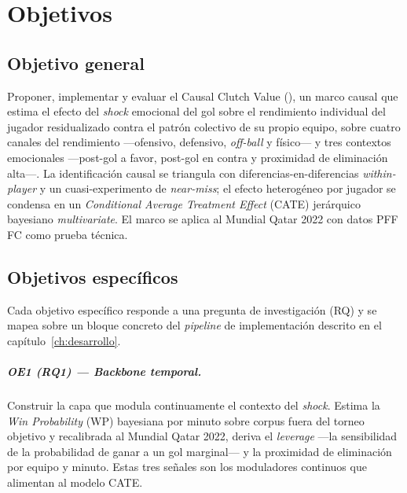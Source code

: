 \chapter{Objetivos}
\label{ch:objetivos}

\section{Objetivo general}
\label{sec:objetivo-general}

Proponer, implementar y evaluar el Causal Clutch Value (\CCV), un marco
causal que estima el efecto del \textit{shock} emocional del gol sobre el
rendimiento individual del jugador residualizado contra el patrón
colectivo de su propio equipo, sobre cuatro canales del rendimiento
---ofensivo, defensivo, \emph{off-ball} y físico--- y tres contextos
emocionales ---post-gol a favor, post-gol en contra y proximidad de
eliminación alta---. La identificación causal se triangula con
diferencias-en-diferencias \textit{within-player} y un cuasi-experimento
de \textit{near-miss}; el efecto heterogéneo por jugador se condensa en
un \textit{Conditional Average Treatment Effect} (CATE) jerárquico
bayesiano \textit{multivariate}. El marco se aplica al Mundial Qatar 2022
con datos PFF FC como prueba técnica.


\section{Objetivos específicos}
\label{sec:objetivos-especificos}

Cada objetivo específico responde a una pregunta de investigación (RQ)
y se mapea sobre un bloque concreto del \emph{pipeline} de
implementación descrito en el capítulo~\ref{ch:desarrollo}.

\paragraph{OE1 (RQ1) --- \textit{Backbone} temporal.}
Construir la capa que modula continuamente el contexto del \textit{shock}.
Estima la \textit{Win Probability} (WP) bayesiana por minuto sobre corpus
fuera del torneo objetivo y recalibrada al Mundial Qatar 2022, deriva el
\textit{leverage} ---la sensibilidad de la probabilidad de ganar a un gol
marginal--- y la proximidad de eliminación por equipo y minuto. Estas tres
señales son los moduladores continuos que alimentan al modelo CATE.

